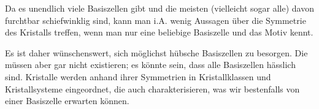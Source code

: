 \begin{remark}
Da es unendlich viele Basiszellen gibt und die meisten (vielleicht sogar alle) davon furchtbar schiefwinklig sind, kann man i.A. wenig Aussagen über die Symmetrie des Kristalls treffen, wenn man nur eine beliebige Basiszelle und das Motiv kennt.

Es ist daher wünschenswert, sich möglichst hübsche Basiszellen zu besorgen. Die müssen aber gar nicht existieren; es könnte sein, dass alle Basiszellen hässlich sind. Kristalle werden anhand ihrer Symmetrien in Kristallklassen und Kristallsysteme eingeordnet, die auch charakterisieren, was wir bestenfalls von einer Basiszelle erwarten können.
\end{remark}